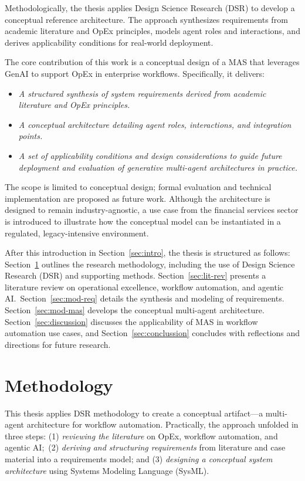 Methodologically, the thesis applies Design Science Research (DSR) to develop a conceptual reference architecture. The approach synthesizes requirements from academic literature and OpEx principles, models agent roles and interactions, and derives applicability conditions for real-world deployment.

The core contribution of this work is a conceptual design of a MAS that leverages GenAI to support OpEx in enterprise workflows. Specifically, it delivers:
\begin{itemize}
    \item \emph{A structured synthesis of system requirements derived from academic literature and OpEx principles.}
    \item \emph{A conceptual architecture detailing agent roles, interactions, and integration points.}
    \item \emph{A set of applicability conditions and design considerations to guide future deployment and evaluation of generative multi-agent architectures in practice.}
\end{itemize}

The scope is limited to conceptual design; formal evaluation and technical implementation are proposed as future work. Although the architecture is designed to remain industry-agnostic, a use case from the financial services sector is introduced to illustrate how the conceptual model can be instantiated in a regulated, legacy-intensive environment.

After this introduction in Section~\ref{sec:intro}, the thesis is structured as follows: Section~\ref{sec:method} outlines the research methodology, including the use of Design Science Research (DSR) and supporting methods. Section~\ref{sec:lit-rev} presents a literature review on operational excellence, workflow automation, and agentic AI.~Section~\ref{sec:mod-req} details the synthesis and modeling of requirements. Section~\ref{sec:mod-mas} develops the conceptual multi-agent architecture. Section~\ref{sec:discussion} discusses the applicability of MAS in workflow automation use cases, and Section~\ref{sec:conclussion} concludes with reflections and directions for future research.

\section{Methodology}\label{sec:method}
This thesis applies DSR methodology to create a conceptual artifact---a multi-agent architecture for workflow automation. Practically, the approach unfolded in three steps: (1) \emph{reviewing the literature} on OpEx, workflow automation, and agentic AI;~(2) \emph{deriving and structuring requirements} from literature and case material into a requirements model; and (3) \emph{designing a conceptual system architecture} using Systems Modeling Language (SysML).

